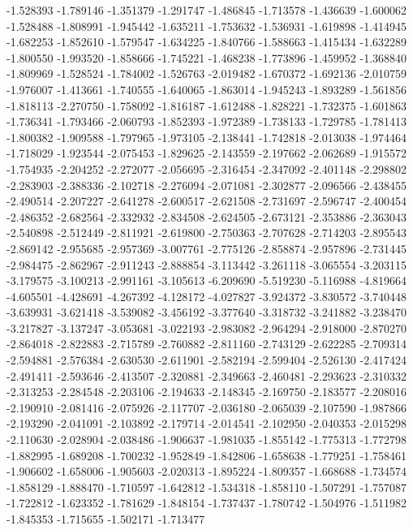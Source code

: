 -1.528393
-1.789146
-1.351379
-1.291747
-1.486845
-1.713578
-1.436639
-1.600062
-1.528488
-1.808991
-1.945442
-1.635211
-1.753632
-1.536931
-1.619898
-1.414945
-1.682253
-1.852610
-1.579547
-1.634225
-1.840766
-1.588663
-1.415434
-1.632289
-1.800550
-1.993520
-1.858666
-1.745221
-1.468238
-1.773896
-1.459952
-1.368840
-1.809969
-1.528524
-1.784002
-1.526763
-2.019482
-1.670372
-1.692136
-2.010759
-1.976007
-1.413661
-1.740555
-1.640065
-1.863014
-1.945243
-1.893289
-1.561856
-1.818113
-2.270750
-1.758092
-1.816187
-1.612488
-1.828221
-1.732375
-1.601863
-1.736341
-1.793466
-2.060793
-1.852393
-1.972389
-1.738133
-1.729785
-1.781413
-1.800382
-1.909588
-1.797965
-1.973105
-2.138441
-1.742818
-2.013038
-1.974464
-1.718029
-1.923544
-2.075453
-1.829625
-2.143559
-2.197662
-2.062689
-1.915572
-1.754935
-2.204252
-2.272077
-2.056695
-2.316454
-2.347092
-2.401148
-2.298802
-2.283903
-2.388336
-2.102718
-2.276094
-2.071081
-2.302877
-2.096566
-2.438455
-2.490514
-2.207227
-2.641278
-2.600517
-2.621508
-2.731697
-2.596747
-2.400454
-2.486352
-2.682564
-2.332932
-2.834508
-2.624505
-2.673121
-2.353886
-2.363043
-2.540898
-2.512449
-2.811921
-2.619800
-2.750363
-2.707628
-2.714203
-2.895543
-2.869142
-2.955685
-2.957369
-3.007761
-2.775126
-2.858874
-2.957896
-2.731445
-2.984475
-2.862967
-2.911243
-2.888854
-3.113442
-3.261118
-3.065554
-3.203115
-3.179575
-3.100213
-2.991161
-3.105613
-6.209690
-5.519230
-5.116988
-4.819664
-4.605501
-4.428691
-4.267392
-4.128172
-4.027827
-3.924372
-3.830572
-3.740448
-3.639931
-3.621418
-3.539082
-3.456192
-3.377640
-3.318732
-3.241882
-3.238470
-3.217827
-3.137247
-3.053681
-3.022193
-2.983082
-2.964294
-2.918000
-2.870270
-2.864018
-2.822883
-2.715789
-2.760882
-2.811160
-2.743129
-2.622285
-2.709314
-2.594881
-2.576384
-2.630530
-2.611901
-2.582194
-2.599404
-2.526130
-2.417424
-2.491411
-2.593646
-2.413507
-2.320881
-2.349663
-2.460481
-2.293623
-2.310332
-2.313253
-2.284548
-2.203106
-2.194633
-2.148345
-2.169750
-2.183577
-2.208016
-2.190910
-2.081416
-2.075926
-2.117707
-2.036180
-2.065039
-2.107590
-1.987866
-2.193290
-2.041091
-2.103892
-2.179714
-2.014541
-2.102950
-2.040353
-2.015298
-2.110630
-2.028904
-2.038486
-1.906637
-1.981035
-1.855142
-1.775313
-1.772798
-1.882995
-1.689208
-1.700232
-1.952849
-1.842806
-1.658638
-1.779251
-1.758461
-1.906602
-1.658006
-1.905603
-2.020313
-1.895224
-1.809357
-1.668688
-1.734574
-1.858129
-1.888470
-1.710597
-1.642812
-1.534318
-1.858110
-1.507291
-1.757087
-1.722812
-1.623352
-1.781629
-1.848154
-1.737437
-1.780742
-1.504976
-1.511982
-1.845353
-1.715655
-1.502171
-1.713477
